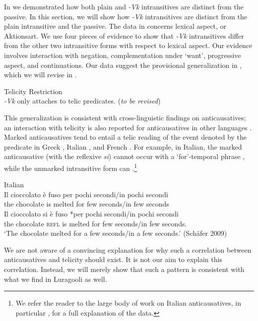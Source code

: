 \documentclass[output=paper]{langsci/lanmgscibook}
\begin{document}
In  we demonstrated how both plain and \textit{-Vk} intransitives are distinct from the passive. In this section, we will show how \textit{-Vk} intransitives are distinct from the plain intransitive and the passive. The data in  concerns lexical aspect, or Aktionsart. We use four pieces of evidence to show that \textit{-Vk} intransitives differ from the other two intransitive forms with respect to lexical aspect. Our evidence involves interaction with negation, complementation under ‘want’, progressive aspect, and continuations. Our data suggest the provisional generalization in , which we will revise in .

\ea\label{ex:gluckman:10} 
{{Telicity Restriction}}\\
 \textit{-Vk} only attaches to telic predicates. (\textit{to be revised})
\z

This generalization is consistent with cross-linguistic findings on anticausatives; an interaction with telicity is also reported for anticausatives in other languages \citep{Labelle1992,Folli2002,FolliHarley2005}. Marked anticausatives tend to entail a telic reading of the event denoted by the predicate in Greek \citep{AlexiadouAnagnostopoulou2004}, Italian \citep{Folli2002}, and French \citep{ZribiHertz1987}. For example, in Italian, the marked anticausative (with the reflexive \textit{si}) cannot occur with a ‘for’-temporal phrase , while the unmarked intransitive form can .\footnote{We refer the reader to the large body of work on Italian anticausatives, in particular \citet{Folli2002}, for a full explanation of the data.}

\ea\label{ex:gluckman:11}
  {Italian}\\
  \ea\label{ex:gluckman:11a}
  \gll  Il   cioccolato è  fuso     per pochi secondi/in pochi secondi\\
	the chocolate  is melted for few    seconds/in few    seconds\\
  \ex       \label{ex:gluckman:11b}
  \gll   Il    cioccolato si     è  fuso     *per pochi secondi/in pochi secondi\\
	the chocolate  \textsc{refl} is melted  for   few   seconds/in few seconds. \\
  \glt ‘The chocolate melted for a few seconds/in a few seconds.’     (Schäfer 2009)
  \z
\z

We are not aware of a convincing explanation for why such a correlation between anticausatives and telicity should exist. It is not our aim to explain this correlation. Instead, we will merely show that such a pattern is consistent with what we find in Luragooli as well. 
\end{document}
